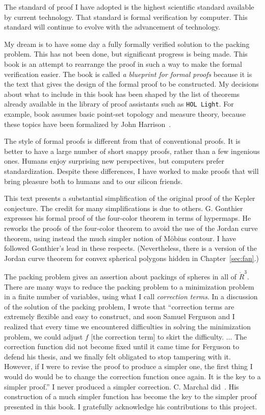 The standard of proof I have adopted is the highest scientific standard
available by current technology.  That 
standard is formal verification by computer.  This standard will
continue to evolve with the advancement of technology.

My dream is to have some day a fully formally verified solution to
the packing problem.
This has not been done, but significant progress is being
made.  This book is an attempt to rearrange the proof
in such a way to make the formal verification easier.  The book is called {\it a blueprint for formal proofs} because it is the text that gives the design of the formal proof to be constructed.  My decisions about what to include in this book has been shaped by the list of theorems already available in the library of proof assistants such as {\tt HOL Light}.  For example, book assumes basic point-set topology and measure theory, because these topics have been formalized by John Harrison~\cite{XX}.  

The style of formal proofs is different from that of
conventional proofs.  It is better to have a large number of short
snappy proofs, rather than a few ingenious ones.  Humans enjoy
surprising new perspectives, but computers prefer standardization.
Despite these differences, I have worked to make proofs that
will bring pleasure both to humans and to our silicon friends.

This text presents a substantial simplification of the original proof of the Kepler conjecture.  The credit for many simplifications is due to others.  G. Gonthier expresses his formal proof of the four-color theorem in terms of hypermaps.  He reworks the proofs of the four-color theorem to avoid the use of the Jordan curve theorem, using instead the much simpler notion of M\"obius contour.  I have followed Gonthier's lead in these respects.  (Nevertheless, there is a version of the Jordan curve theorem for convex spherical polygons hidden in Chapter~\ref{sec:fan}.)  

The packing problem gives an assertion about packings of spheres in all of $\ring{R}^3$.  There are many ways to reduce the packing problem to a minimization problem in a finite number of variables, using what I call {\it correction terms}.  In a discussion of the solution of the packing problem, I wrote that ``correction terms are extremely flexible and easy to construct, and soon Samuel Ferguson and I realized that every time we encountered difficulties in solving the minimization problem, we could adjust $f$ [the correction term] to skirt the difficulty. $\ldots$  The correction function did not become fixed until it came time for Ferguson to defend his thesis, and we finally felt obligated to stop tampering with it.  However, if I were to revise the proof to produce a simpler one, the first thing I would do would be to change the correction function once again.  It is the key to a simpler proof.''  I never produced a simpler correction.  C. Marchal did~\cite{XX}.  His construction of a much simpler function has become the key to the simpler proof presented in this book.  I gratefully acknowledge his contributions to this project.



